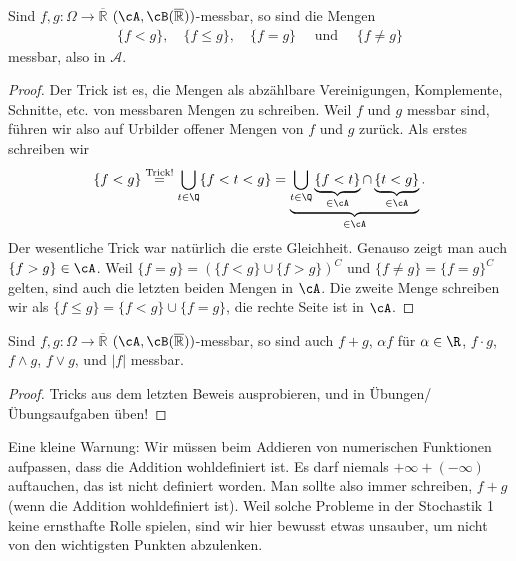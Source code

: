 \begin{lemma}\label{me}
	Sind $f,g \! : \Omega \rightarrow \overline{\mathbb{R}}$ $(\cA, \cB(\overline{\mathbb{R}}))$-messbar, so sind die Mengen 
\begin{align*}
	\{ f < g \},\quad \{ f \leq g \}, \quad \{ f = g \}\quad\text{ und }\quad \{ f \neq g \}
\end{align*}	
	messbar, also in $\mathcal A$.
\end{lemma}

\begin{proof}
Der Trick ist es, die Mengen als abz\"ahlbare Vereinigungen, Komplemente, Schnitte, etc. von messbaren Mengen zu schreiben. Weil $f$ und $g$ messbar sind, f\"uhren wir also auf Urbilder offener Mengen von $f$ und $g$ zur\"uck. Als erstes schreiben wir 
 \begin{gather*}
		\{ f < g \} \overset{\text{Trick!}}{=} \bigcup\limits_{t \in \Q} \{ f < t < g \} =\underbrace{\bigcup\limits_{t \in \Q} \underbrace{\{ f < t \}}_{\in \cA} \cap \underbrace{\{ t < g \}}_{\in \cA}}_{\in \cA}.
\end{gather*}	
Der wesentliche Trick war nat\"urlich die erste Gleichheit. Genauso zeigt man auch $\{ f > g \} \in \cA$. Weil $\{ f = g \} = (\{ f < g \} \cup \{ f>g \})^C$ und $\{ f \neq g \} = \{ f = g \}^C$ gelten, sind auch die letzten beiden Mengen in $\cA$. Die zweite Menge schreiben wir als $\{f\leq g\}=\{f<g\}\cup \{f=g\}$, die rechte Seite ist in $\cA$.
\end{proof}

\begin{lemma}\label{hilf}
	Sind $f,g \! : \Omega \rightarrow \overline{\mathbb{R}}$ $(\cA, \cB(\overline{\mathbb{R}}))$-messbar, so sind auch $f+g$, $\alpha f$ f\"ur $\alpha\in \R$, $f \cdot g$, $f \land g$, $f \lor g$, und $|f|$ messbar.
\end{lemma}
\begin{proof}
	Tricks aus dem letzten Beweis ausprobieren, und in \"Ubungen/\"Ubungsaufgaben \"uben!
\end{proof}
Eine kleine Warnung: Wir m\"ussen beim Addieren von numerischen Funktionen aufpassen, dass die Addition wohldefiniert ist. Es darf niemals $+\infty+(-\infty)$ auftauchen, das ist nicht definiert worden. Man sollte also immer schreiben, \glqq$f+g$ (wenn die Addition wohldefiniert ist)\grqq. Weil solche Probleme in der Stochastik 1 keine ernsthafte Rolle spielen, sind wir hier bewusst etwas unsauber, um nicht von den wichtigsten Punkten abzulenken.\smallskip

